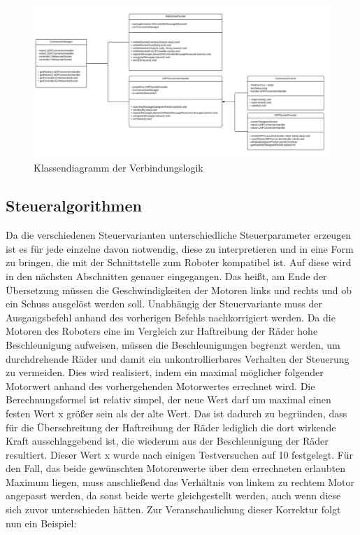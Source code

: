 \begin{figure}[h]
	\includegraphics[width=\textwidth]{images/uml_verbindung.pdf}
	\caption{Klassendiagramm der Verbindungslogik}
	\label{fig:uml_verbindung}
\end{figure}



\subsection{Steueralgorithmen}
Da die verschiedenen Steuervarianten unterschiedliche Steuerparameter erzeugen ist es für jede einzelne davon notwendig, diese zu interpretieren und in eine Form zu bringen, die mit der Schnittstelle zum Roboter kompatibel ist. Auf diese wird in den nächsten Abschnitten genauer eingegangen. Das heißt, am Ende der Übersetzung müssen die Geschwindigkeiten der Motoren links und rechts und ob ein Schuss ausgelöst werden soll. Unabhängig der Steuervariante muss der Ausgangsbefehl anhand des vorherigen Befehls nachkorrigiert werden. Da die Motoren des Roboters eine im Vergleich zur Haftreibung der Räder hohe Beschleunigung aufweisen, müssen die Beschleunigungen begrenzt werden, um durchdrehende Räder und damit ein unkontrollierbares Verhalten der Steuerung zu vermeiden. 
Dies wird realisiert, indem ein maximal möglicher folgender Motorwert anhand des vorhergehenden Motorwertes errechnet wird. Die Berechnungsformel ist relativ simpel, der neue Wert darf um maximal einen festen Wert x größer sein als der alte Wert. Das ist dadurch zu begründen, dass für die Überschreitung der Haftreibung der Räder lediglich die dort wirkende Kraft ausschlaggebend ist, die wiederum aus der Beschleunigung der Räder resultiert. Dieser Wert x wurde nach einigen Testversuchen auf 10 festgelegt. Für den Fall, das beide gewünschten Motorenwerte über dem errechneten erlaubten Maximum liegen, muss anschließend das Verhältnis von linkem zu rechtem Motor angepasst werden, da sonst beide werte gleichgestellt werden, auch wenn diese sich zuvor unterschieden hätten. 
Zur Veranschaulichung dieser Korrektur folgt nun ein Beispiel:

